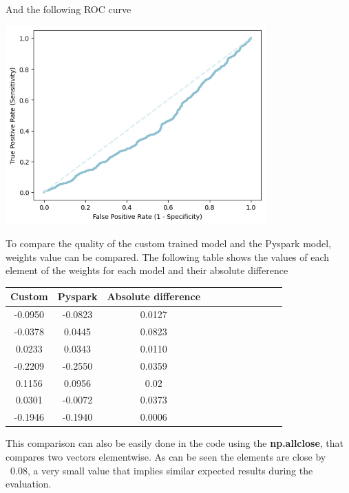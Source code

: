 \documentclass[
	letterpaper, %
	10pt, %
]{class}
\begin{document}
And the following ROC curve

\begin{center}
    \includegraphics[width=10cm]{../images/ml_logistic.png}
\end{center}

To compare the quality of the custom trained model and the Pyspark model, weights value can be compared. The following table shows the values of each element of the weights for each model and their absolute difference

\begin{center}
    \begin{tabular}{ |c|c|c|c|c|c|c|c|c|c|c| }
        \hline
        Custom  & Pyspark & Absolute difference \\
        \hline
        -0.0950 & -0.0823 & 0.0127              \\
        -0.0378 & 0.0445  & 0.0823              \\
        0.0233  & 0.0343  & 0.0110              \\
        -0.2209 & -0.2550 & 0.0359              \\
        0.1156  & 0.0956  & 0.02                \\
        0.0301  & -0.0072 & 0.0373              \\
        -0.1946 & -0.1940 & 0.0006              \\
        \hline
    \end{tabular}
\end{center}

This comparison can also be easily done in the code using the \textbf{np.allclose}, that compares two vectors elementwise.
As can be seen the elements are close by ~0.08, a very small value that implies similar expected results during the evaluation.\\
\end{document}
